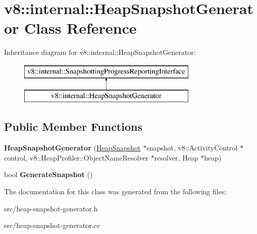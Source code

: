 \hypertarget{classv8_1_1internal_1_1_heap_snapshot_generator}{}\section{v8\+:\+:internal\+:\+:Heap\+Snapshot\+Generator Class Reference}
\label{classv8_1_1internal_1_1_heap_snapshot_generator}
Inheritance diagram for v8\+:\+:internal\+:\+:Heap\+Snapshot\+Generator\+:\begin{figure}[H]
\begin{center}
\leavevmode
\includegraphics[height=2.000000cm]{classv8_1_1internal_1_1_heap_snapshot_generator}
\end{center}
\end{figure}
\subsection*{Public Member Functions}
\begin{DoxyCompactItemize}
\item 
\hypertarget{classv8_1_1internal_1_1_heap_snapshot_generator_a45c0f122b9dccf1bc08cac2de7c2b0e2}{}{\bfseries Heap\+Snapshot\+Generator} (\hyperlink{classv8_1_1internal_1_1_heap_snapshot}{Heap\+Snapshot} $\ast$snapshot, v8\+::\+Activity\+Control $\ast$control, v8\+::\+Heap\+Profiler\+::\+Object\+Name\+Resolver $\ast$resolver, Heap $\ast$heap)\label{classv8_1_1internal_1_1_heap_snapshot_generator_a45c0f122b9dccf1bc08cac2de7c2b0e2}

\item 
\hypertarget{classv8_1_1internal_1_1_heap_snapshot_generator_a5119a215e57adbedee69fde36570a0dc}{}bool {\bfseries Generate\+Snapshot} ()\label{classv8_1_1internal_1_1_heap_snapshot_generator_a5119a215e57adbedee69fde36570a0dc}

\end{DoxyCompactItemize}


The documentation for this class was generated from the following files\+:\begin{DoxyCompactItemize}
\item 
src/heap-\/snapshot-\/generator.\+h\item 
src/heap-\/snapshot-\/generator.\+cc\end{DoxyCompactItemize}
